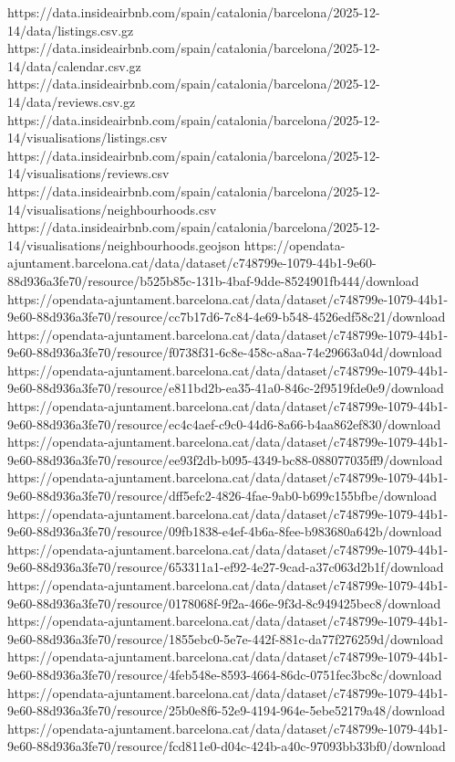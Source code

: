 https://data.insideairbnb.com/spain/catalonia/barcelona/2025-12-14/data/listings.csv.gz
https://data.insideairbnb.com/spain/catalonia/barcelona/2025-12-14/data/calendar.csv.gz
https://data.insideairbnb.com/spain/catalonia/barcelona/2025-12-14/data/reviews.csv.gz
https://data.insideairbnb.com/spain/catalonia/barcelona/2025-12-14/visualisations/listings.csv
https://data.insideairbnb.com/spain/catalonia/barcelona/2025-12-14/visualisations/reviews.csv
https://data.insideairbnb.com/spain/catalonia/barcelona/2025-12-14/visualisations/neighbourhoods.csv
https://data.insideairbnb.com/spain/catalonia/barcelona/2025-12-14/visualisations/neighbourhoods.geojson
https://opendata-ajuntament.barcelona.cat/data/dataset/c748799e-1079-44b1-9e60-88d936a3fe70/resource/b525b85c-131b-4baf-9dde-8524901fb444/download
https://opendata-ajuntament.barcelona.cat/data/dataset/c748799e-1079-44b1-9e60-88d936a3fe70/resource/cc7b17d6-7c84-4e69-b548-4526edf58c21/download
https://opendata-ajuntament.barcelona.cat/data/dataset/c748799e-1079-44b1-9e60-88d936a3fe70/resource/f0738f31-6c8e-458c-a8aa-74e29663a04d/download
https://opendata-ajuntament.barcelona.cat/data/dataset/c748799e-1079-44b1-9e60-88d936a3fe70/resource/e811bd2b-ea35-41a0-846c-2f9519fde0e9/download
https://opendata-ajuntament.barcelona.cat/data/dataset/c748799e-1079-44b1-9e60-88d936a3fe70/resource/ec4c4aef-c9c0-44d6-8a66-b4aa862ef830/download
https://opendata-ajuntament.barcelona.cat/data/dataset/c748799e-1079-44b1-9e60-88d936a3fe70/resource/ee93f2db-b095-4349-bc88-088077035ff9/download
https://opendata-ajuntament.barcelona.cat/data/dataset/c748799e-1079-44b1-9e60-88d936a3fe70/resource/dff5efc2-4826-4fae-9ab0-b699c155bfbe/download
https://opendata-ajuntament.barcelona.cat/data/dataset/c748799e-1079-44b1-9e60-88d936a3fe70/resource/09fb1838-e4ef-4b6a-8fee-b983680a642b/download
https://opendata-ajuntament.barcelona.cat/data/dataset/c748799e-1079-44b1-9e60-88d936a3fe70/resource/653311a1-ef92-4e27-9cad-a37c063d2b1f/download
https://opendata-ajuntament.barcelona.cat/data/dataset/c748799e-1079-44b1-9e60-88d936a3fe70/resource/0178068f-9f2a-466e-9f3d-8c949425bec8/download
https://opendata-ajuntament.barcelona.cat/data/dataset/c748799e-1079-44b1-9e60-88d936a3fe70/resource/1855ebc0-5e7e-442f-881c-da77f276259d/download
https://opendata-ajuntament.barcelona.cat/data/dataset/c748799e-1079-44b1-9e60-88d936a3fe70/resource/4feb548e-8593-4664-86dc-0751fec3bc8c/download
https://opendata-ajuntament.barcelona.cat/data/dataset/c748799e-1079-44b1-9e60-88d936a3fe70/resource/25b0e8f6-52e9-4194-964e-5ebe52179a48/download
https://opendata-ajuntament.barcelona.cat/data/dataset/c748799e-1079-44b1-9e60-88d936a3fe70/resource/fcd811e0-d04c-424b-a40c-97093bb33bf0/download
